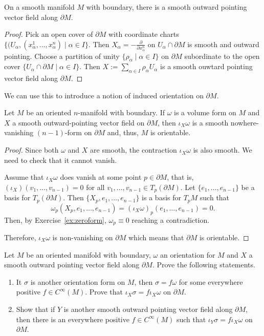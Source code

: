 \begin{proposition}
  On a smooth manifold $M$ with boundary, there is a smooth outward pointing vector field along $\partial M$.  
\end{proposition}
\begin{proof}
  Pick an open cover of $\partial M$ with coordinate charts $\{(U_\alpha, (x^1_\alpha,\ldots,x^n_\alpha) \mid \alpha\in I\}$. Then $X_\alpha = -\frac{\partial}{\partial x^n_\alpha}$ on $U_\alpha\cap \partial M$ is smooth and outward pointing.
  Choose a partition of unity $\{\rho_\alpha \mid \alpha\in I\}$ on $\partial M$ subordinate to the open cover $\{U_\alpha\cap \partial M \mid \alpha\in I\}$.
  Then $X:= \sum_{\alpha\in I}\rho_\alpha U_\alpha$ is a smooth ouwtard pointing vector field along $\partial M$.
\end{proof}

We can use this to introduce a notion of induced orientation on $\partial M$.

\begin{proposition}
  Let $M$ be an oriented $n$-manifold with boundary.
  If $\omega$ is a volume form on $M$ and $X$ a smooth outward-pointing vector field on $\partial M$, then $\iota_X\omega$ is a smooth nowhere-vanishing $(n-1)$-form on $\partial M$ and, thus, $M$ is orientable.
\end{proposition}
\begin{proof}
  Since both $\omega$ and $X$ are smooth, the contraction $\iota_X\omega$ is also smooth.
  We need to check that it cannot vanish.

  Assume that $\iota_X\omega$ does vanish at some point $p\in\partial M$, that is, $(\iota_X)(v_1, \ldots, v_{n-1}) = 0$ for all $v_1, \ldots, v_{n-1}\in T_p(\partial M)$.
  Let $\{e_1,\ldots,e_{n-1}\}$ be a basis for $T_p(\partial M)$.
  Then $\{X_p,e_1,\ldots,e_{n-1}\}$ is a basis for $T_p M$ such that
  \begin{equation}
    \omega_p(X_p, e_1, \ldots, e_{n-1}) = (\iota_X\omega)_p(e_1, \ldots, e_{n-1}) = 0.
  \end{equation}
  Then, by Exercise~\ref{ex:zeroform}, $\omega_p\equiv0$ reaching a contradiction.
  
  Therefore, $\iota_X\omega$ is non-vanishing on $\partial M$ which means that $\partial M$ is orientable.
\end{proof}

\begin{exercise}
  Let $M$ be an oriented manifold with boundary, $\omega$ an orientation for $M$ and $X$ a smooth outward pointing vector field along $\partial M$.
  Prove the following statements.
  \begin{enumerate}
    \item It $\sigma$ is another orientation form on $M$, then $\sigma = f\omega$ for some everywhere positive $f\in C^\infty(M)$. Prove that  $\iota_X\sigma = f\iota_X \omega$ on $\partial M$.
    \item Show that if $Y$ is another smooth outward pointing vector field along $\partial M$, then there is an everywhere positive $f\in C^\infty(M)$ such that $\iota_Y\sigma = f \iota_X \omega$ on $\partial M$.
  \end{enumerate}
\end{exercise}

